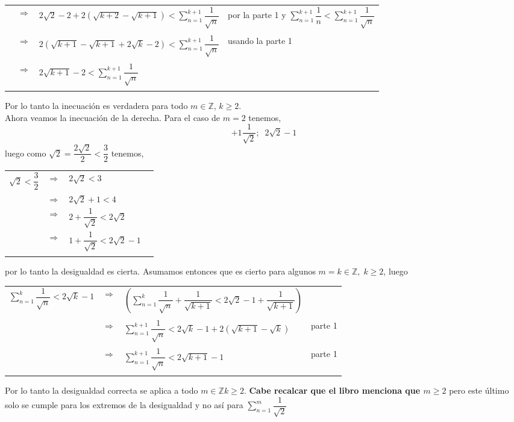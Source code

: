 \begin{enumerate}[\bfseries  1.]
\begin{center}
\begin{tabular}{r c l l}
&$\Rightarrow$&$2\sqrt{2} - 2 + 2(\sqrt{k+2} - \sqrt{k+1}) < \sum\limits_{n=1}^{k+1} \dfrac{1}{\sqrt{n}}$& por la parte 1 y $\sum\limits_{n=1}^{k+1} \dfrac{1}{n}<\sum\limits_{n=1}^{k+1} \dfrac{1}{\sqrt{n}}$\\\\
&$\Rightarrow$&$2(\sqrt{k+1} - \sqrt{k+1} + 2\sqrt{k} -2) < \sum\limits_{n=1}^{k+1} \dfrac{1}{\sqrt{n}}$&usando la parte 1\\\\
&$\Rightarrow$&$2\sqrt{k+1} - 2 < \sum_{n=1}^{k+1} \dfrac{1}{\sqrt{n}}$&\\\\
\end{tabular}
\end{center}
\end{enumerate}
Por lo tanto la inecuación es verdadera para todo $m \in \mathbb{Z}$, $k\geq 2.$\\
Ahora veamos la inecuación de la derecha. Para el caso de $m=2$ tenemos,
$$+1\dfrac{1}{\sqrt{2}}; \; \; 2\sqrt{2} - 1$$
luego como $\sqrt{2} = \dfrac{2\sqrt{2}}{2}< \dfrac{3}{2}$ tenemos,
\begin{center}
\begin{tabular}{rcll}
$\sqrt{2}< \dfrac{3}{2}$&$\Rightarrow$&$2\sqrt{2}<3$&\\
&$\Rightarrow$&$2\sqrt{2} + 1 < 4$&\\
&$\Rightarrow$&$2 + \dfrac{1}{\sqrt{2}}< 2\sqrt{2}$&\\
&$\Rightarrow$&$1 + \dfrac{1}{\sqrt{2}}<2 \sqrt{2} -1$&\\\\
\end{tabular}
\end{center} 
por lo tanto la desigualdad es cierta. Asumamos entonces que es cierto para algunos $m = k \in \mathbb{Z}, \; k\geq 2$, luego
\begin{center}
\begin{tabular}{rcll}
$\sum\limits_{n=1}^k \dfrac{1}{\sqrt{n}} < 2\sqrt{k} - 1$&$\Rightarrow$&$\left( \sum\limits_{n=1}^k \dfrac{1}{\sqrt{n}} + \dfrac{1}{\sqrt{k+1}} < 2 \sqrt{2} -1 + \dfrac{1}{\sqrt{k+1}}\right)$&\\\\
&$\Rightarrow$&$\sum\limits_{n=1}^{k+1} \dfrac{1}{\sqrt{n}} < 2\sqrt{k} - 1 + 2(\sqrt{k+1} - \sqrt{k})$&parte 1\\\\
&$\Rightarrow$&$\sum\limits_{n=1}^{k+1} \dfrac{1}{\sqrt{n}} < 2\sqrt{k+1} - 1$&parte 1 \\\\
\end{tabular}
\end{center}
Por lo tanto la desigualdad correcta se aplica a todo $m \in \mathbb{Z} k \geq 2$.
\textbf{Cabe recalcar que el libro menciona que $m\geq 2$} pero este último solo se cumple para los extremos de la desigualdad y no así para $\sum\limits_{n=1}^m \dfrac{1}{\sqrt{2}}$\\\\

